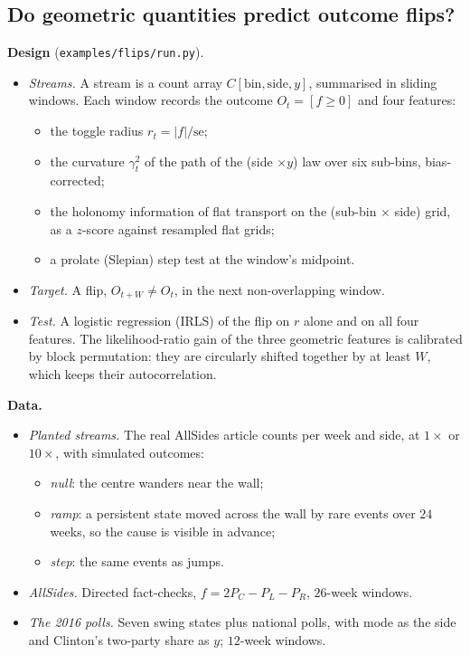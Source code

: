 \documentclass[11pt]{article}
\theoremstyle{definition}
\theoremstyle{remark}
\begin{document}
\subsection{Do geometric quantities predict outcome flips?}
\textbf{Design} (\texttt{examples/flips/run.py}).
\begin{itemize}
  \item \emph{Streams.} A stream is a count array $C[\text{bin},\text{side},y]$, summarised in sliding windows. Each window records the outcome $O_t=[f\ge0]$ and four features:
  \begin{itemize}
    \item the toggle radius $r_t=|f|/\mathrm{se}$;
    \item the curvature $\gamma^2_t$ of the path of the (side $\times y$) law over six sub-bins, bias-corrected;
    \item the holonomy information of flat transport on the (sub-bin $\times$ side) grid, as a $z$-score against resampled flat grids;
    \item a prolate (Slepian) step test at the window's midpoint.
  \end{itemize}
  \item \emph{Target.} A flip, $O_{t+W}\ne O_t$, in the next non-overlapping window.
  \item \emph{Test.} A logistic regression (IRLS) of the flip on $r$ alone and on all four features. The likelihood-ratio gain of the three geometric features is calibrated by block permutation: they are circularly shifted together by at least $W$, which keeps their autocorrelation.
\end{itemize}
\textbf{Data.}
\begin{itemize}
  \item \emph{Planted streams.} The real AllSides article counts per week and side, at $1\times$ or $10\times$, with simulated outcomes:
  \begin{itemize}
    \item \emph{null}: the centre wanders near the wall;
    \item \emph{ramp}: a persistent state moved across the wall by rare events over $24$ weeks, so the cause is visible in advance;
    \item \emph{step}: the same events as jumps.
  \end{itemize}
  \item \emph{AllSides.} Directed fact-checks, $f=2P_C-P_L-P_R$, $26$-week windows.
  \item \emph{The 2016 polls.} Seven swing states plus national polls, with mode as the side and Clinton's two-party share as $y$; $12$-week windows.
\end{itemize}
\end{document}
